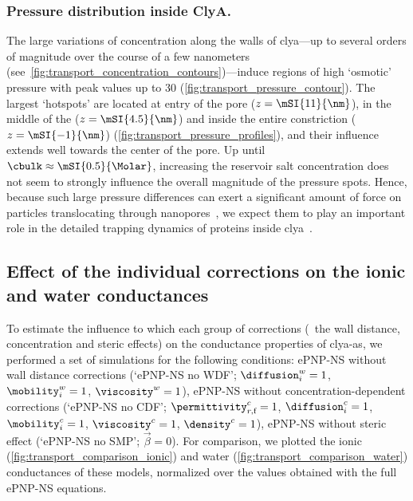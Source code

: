 \subsubsection{Pressure distribution inside ClyA.}
%
The large variations of \Na{} concentration along the walls of \gls{clya}---up to several orders of magnitude
over the course of a few nanometers (see~\cref{fig:transport_concentration_contours})---induce regions of high
`osmotic' pressure with peak values up to \SI{30}{\atm} (\cref{fig:transport_pressure_contour}). The largest
`hotspots' are located at \cisi{} entry of the pore ($z = \mSI{11}{\nm}$), in the middle of the \lumen{} ($z =
\mSI{4.5}{\nm}$) and inside the entire constriction ($z = \mSI{-1}{\nm}$)
(\cref{fig:transport_pressure_profiles}), and their influence extends well towards the center of the pore. Up
until $\cbulk \approx \mSI{0.5}{\Molar}$, increasing the reservoir salt concentration does not seem to
strongly influence the overall magnitude of the pressure spots. Hence, because such large pressure differences
can  exert a significant amount of force on particles translocating through nanopores~\cite{Hoogerheide-2014},
we expect them to play an important role in the detailed trapping dynamics of proteins inside
\gls{clya}~\cite{Soskine-Biesemans-2015,Willems-Ruic-Biesemans-2019}.


\subsection{Effect of the individual corrections on the ionic and water conductances}
%
\label{sec:transport:comparison_corrections}
%

To estimate the influence to which each group of corrections (\ie~the wall distance, concentration and steric
effects) on the conductance properties of \gls{clya-as}, we performed a set of simulations for the following
conditions: {ePNP-NS} without wall distance corrections (`ePNP-NS no WDF'; $\diffusion_{i}^w=1$,
$\mobility_{i}^w=1$, $\viscosity^w=1$), {ePNP-NS} without concentration-dependent corrections (`ePNP-NS no
CDF'; $\permittivity_{r,\text{f}}^c=1$, $\diffusion_{i}^c=1$, $\mobility_{i}^c=1$, $\viscosity^c=1$,
$\density^c=1$), {ePNP-NS} without steric effect (`ePNP-NS no SMP'; $\vec{\beta}=0$). For comparison, we
plotted the ionic (\cref{fig:transport_comparison_ionic}) and water (\cref{fig:transport_comparison_water})
conductances of these models, normalized over the values obtained with the full {ePNP-NS} equations.

